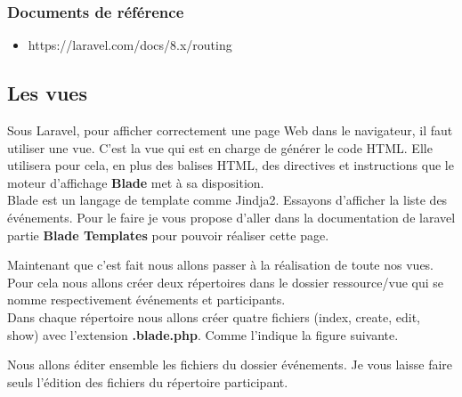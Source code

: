 \documentclass[12pt,a4paper]{article}
\begin{document}
\subsubsection{Documents de référence}


\begin{itemize}
\item https://laravel.com/docs/8.x/routing
\end{itemize}

\subsection{Les vues}

Sous Laravel, pour afficher correctement une page Web dans le navigateur, il faut utiliser une vue. C'est la vue qui est en charge de générer le code HTML. Elle utilisera pour cela, en plus des balises HTML, des directives et instructions que le moteur d'affichage \textbf{Blade} met à sa disposition.\\
Blade est un langage de template comme Jindja2. 
Essayons d'afficher la liste des événements. Pour le faire je vous propose d'aller dans la documentation de laravel partie \textbf{Blade Templates} pour pouvoir réaliser cette page.


Maintenant que c'est fait nous allons passer à la réalisation de toute nos vues. Pour cela nous allons créer deux répertoires dans le dossier ressource/vue qui se nomme respectivement événements et participants.\\
Dans chaque répertoire nous allons créer quatre fichiers (index, create, edit, show) avec l’extension \textbf{.blade.php}. Comme l'indique la figure suivante.

Nous allons éditer ensemble les fichiers du dossier événements. Je vous laisse faire seuls l'édition des fichiers du répertoire participant.
\end{document}
